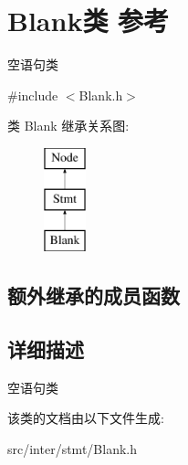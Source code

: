 \hypertarget{class_blank}{}\section{Blank类 参考}
\label{class_blank}


空语句类  




{\ttfamily \#include $<$Blank.\+h$>$}

类 Blank 继承关系图\+:\begin{figure}[H]
\begin{center}
\leavevmode
\includegraphics[height=3.000000cm]{class_blank}
\end{center}
\end{figure}
\subsection*{额外继承的成员函数}


\subsection{详细描述}
空语句类 

该类的文档由以下文件生成\+:\begin{DoxyCompactItemize}
\item 
src/inter/stmt/Blank.\+h\end{DoxyCompactItemize}
